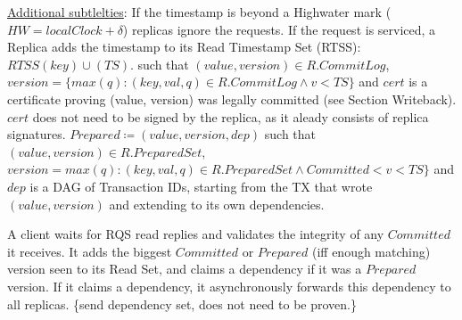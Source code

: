 \begin{enumerate}
\underline{Additional subtlelties}: If the timestamp is beyond a Highwater mark ($HW = localClock + \delta$) replicas ignore the requests. If the request is serviced, a Replica adds the timestamp to its Read Timestamp Set (RTSS): $RTSS(key) \cup (TS)$.  such that $ (value, version) \in R.CommitLog$, $version = \{max(q) : (key, val, q) \in R.CommitLog \land v < TS \}$ and $cert$ is a certificate proving (value, version) was legally committed (see Section Writeback). $cert$ does not need to be signed by the replica, as it aleady consists of replica signatures.
 $Prepared \coloneqq (value, version, dep)$ such that $(value, version) \in R.PreparedSet$, $version = max(q) : (key, val, q) \in R.PreparedSet \land Committed < v < TS \}$ and $dep$ is a DAG of Transaction IDs, starting from the TX that wrote $(value, version)$ and extending to its own dependencies.





A client waits for RQS read replies and validates the integrity of any $Committed$ it receives.  It adds the biggest $Committed$ or $Prepared$ (iff enough matching) version seen to its Read Set, and claims a dependency if it was a $Prepared$ version. If it claims a dependency, it asynchronously forwards this dependency to all replicas. 
\{send dependency set, does not need to be proven.\}



\end{enumerate}
